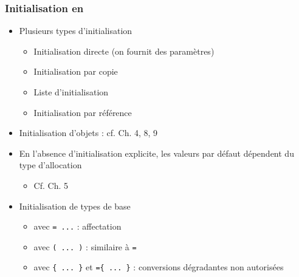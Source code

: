 \begin{frame}
\frametitle{Initialisation en \cpp}
\begin{itemize}[<+->]
\item Plusieurs types d'initialisation
	\begin{itemize}
	\item Initialisation directe (on fournit des paramètres)
	\item Initialisation par copie
	\item Liste d'initialisation
	\item Initialisation par référence
	\end{itemize}
\item Initialisation d'objets : cf. Ch. 4, 8, 9
\item En l'absence d'initialisation explicite, les valeurs par défaut dépendent du type d'allocation
	\begin{itemize}
	\item Cf. Ch. 5
	\end{itemize}
\item Initialisation de types de base
	\begin{itemize}
	\item avec \texttt{= ...} : affectation
	\item avec \texttt{( ... )} : similaire à \texttt{=}
	\item avec \texttt{\{ ... \}} et \texttt{=\{ ... \}} : conversions dégradantes non autorisées
	\end{itemize}
\end{itemize}
\end{frame}

